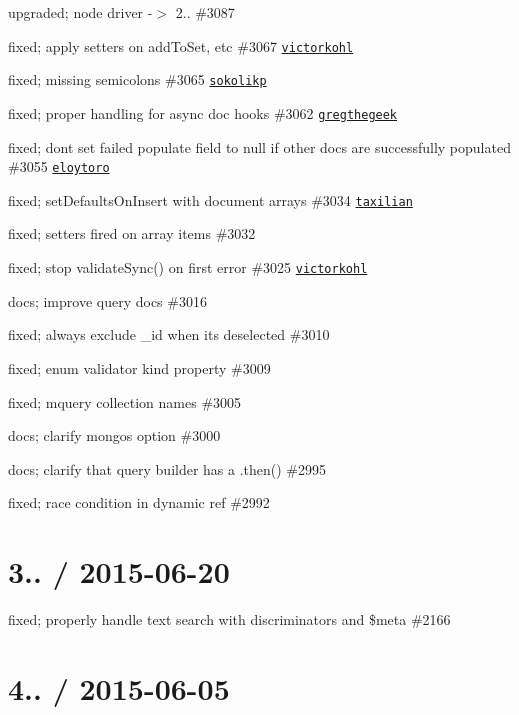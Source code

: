 \begin{DoxyItemize}
\item upgraded; node driver -\/$>$ 2.. \#3087
\item fixed; apply setters on add\+To\+Set, etc \#3067 \href{https://github.com/victorkohl}{\tt victorkohl}
\item fixed; missing semicolons \#3065 \href{https://github.com/sokolikp}{\tt sokolikp}
\item fixed; proper handling for async doc hooks \#3062 \href{https://github.com/gregthegeek}{\tt gregthegeek}
\item fixed; dont set failed populate field to null if other docs are successfully populated \#3055 \href{https://github.com/eloytoro}{\tt eloytoro}
\item fixed; set\+Defaults\+On\+Insert with document arrays \#3034 \href{https://github.com/taxilian}{\tt taxilian}
\item fixed; setters fired on array items \#3032
\item fixed; stop validate\+Sync() on first error \#3025 \href{https://github.com/victorkohl}{\tt victorkohl}
\item docs; improve query docs \#3016
\item fixed; always exclude \+\_\+id when its deselected \#3010
\item fixed; enum validator kind property \#3009
\item fixed; mquery collection names \#3005
\item docs; clarify mongos option \#3000
\item docs; clarify that query builder has a .then() \#2995
\item fixed; race condition in dynamic ref \#2992
\end{DoxyItemize}

\section*{3.. / 2015-\/06-\/20 }


\begin{DoxyItemize}
\item fixed; properly handle text search with discriminators and \$meta \#2166
\end{DoxyItemize}

\section*{4.. / 2015-\/06-\/05 }


